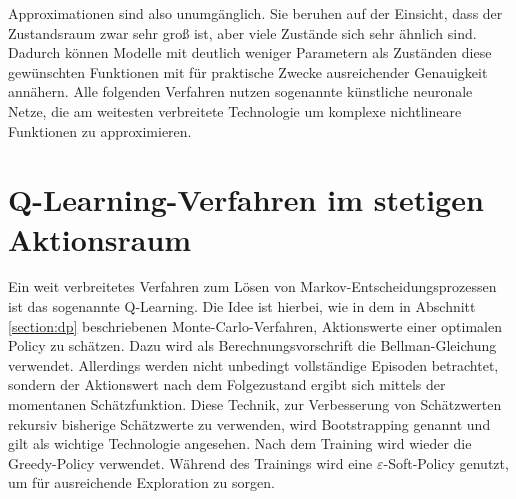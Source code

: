 Approximationen sind also unumgänglich.
Sie beruhen auf der Einsicht, dass der Zustandsraum zwar sehr groß ist, aber viele Zustände sich sehr ähnlich sind.
Dadurch können Modelle mit deutlich weniger Parametern als Zuständen diese gewünschten Funktionen  mit für praktische Zwecke ausreichender Genauigkeit annähern.
Alle folgenden Verfahren nutzen sogenannte künstliche neuronale Netze, die am weitesten verbreitete Technologie um komplexe nichtlineare Funktionen zu approximieren.

\section{Q-Learning-Verfahren im stetigen Aktionsraum}
\label{section:qlearning}
Ein weit verbreitetes Verfahren zum Lösen von Markov-Entscheidungsprozessen ist das sogenannte Q-Learning.
Die Idee ist hierbei, wie in dem in Abschnitt \ref{section:dp} beschriebenen Monte-Carlo-Verfahren, Aktionswerte einer optimalen Policy zu schätzen.
Dazu wird als Berechnungsvorschrift die Bellman-Gleichung verwendet.
Allerdings werden nicht unbedingt vollständige Episoden betrachtet, sondern der Aktionswert nach dem Folgezustand ergibt sich mittels der momentanen Schätzfunktion.
Diese Technik, zur Verbesserung von Schätzwerten rekursiv bisherige Schätzwerte zu verwenden, wird Bootstrapping genannt und gilt als wichtige Technologie angesehen. \cite{Sutton1998}
Nach dem Training wird wieder die Greedy-Policy verwendet.
Während des Trainings wird eine $\varepsilon$-Soft-Policy genutzt, um für ausreichende Exploration zu sorgen.

